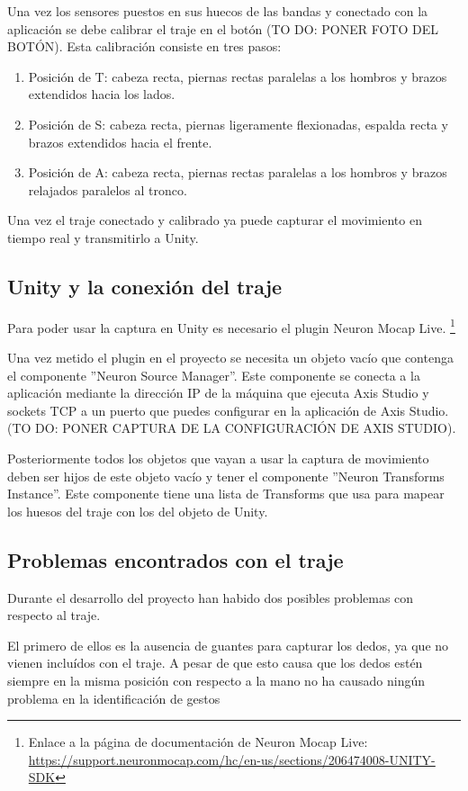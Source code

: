 Una vez los sensores puestos en sus huecos de las bandas y conectado con la aplicación se debe calibrar el traje en el botón (TO DO: PONER FOTO DEL BOTÓN).
Esta calibración consiste en tres pasos:
\begin{enumerate}
    \item Posición de T: cabeza recta, piernas rectas paralelas a los hombros y brazos extendidos hacia los lados.
    \item Posición de S: cabeza recta, piernas ligeramente flexionadas, espalda recta y brazos extendidos hacia el frente.
    \item Posición de A: cabeza recta, piernas rectas paralelas a los hombros y brazos relajados paralelos al tronco.
\end{enumerate}

Una vez el traje conectado y calibrado ya puede capturar el movimiento en tiempo real y transmitirlo a Unity.
\subsection{Unity y la conexión del traje}
Para poder usar la captura en Unity es necesario el plugin Neuron Mocap Live. \footnote{Enlace a la página de documentación de Neuron Mocap Live: \url{https://support.neuronmocap.com/hc/en-us/sections/206474008-UNITY-SDK}}

Una vez metido el plugin en el proyecto se necesita un objeto vacío que contenga el componente ''Neuron Source Manager''.
Este componente se conecta a la aplicación mediante la dirección IP de la máquina que ejecuta Axis Studio y sockets TCP a un puerto que puedes configurar en la aplicación de Axis Studio. (TO DO: PONER CAPTURA DE LA CONFIGURACIÓN DE AXIS STUDIO).

Posteriormente todos los objetos que vayan a usar la captura de movimiento deben ser hijos de este objeto vacío y tener el componente ''Neuron Transforms Instance''.
Este componente tiene una lista de Transforms que usa para mapear los huesos del traje con los del objeto de Unity.

\subsection{Problemas encontrados con el traje}
Durante el desarrollo del proyecto han habido dos posibles problemas con respecto al traje.

El primero de ellos es la ausencia de guantes para capturar los dedos, ya que no vienen incluídos con el traje.
A pesar de que esto causa que los dedos estén siempre en la misma posición con respecto a la mano no ha causado ningún problema en la identificación de gestos

